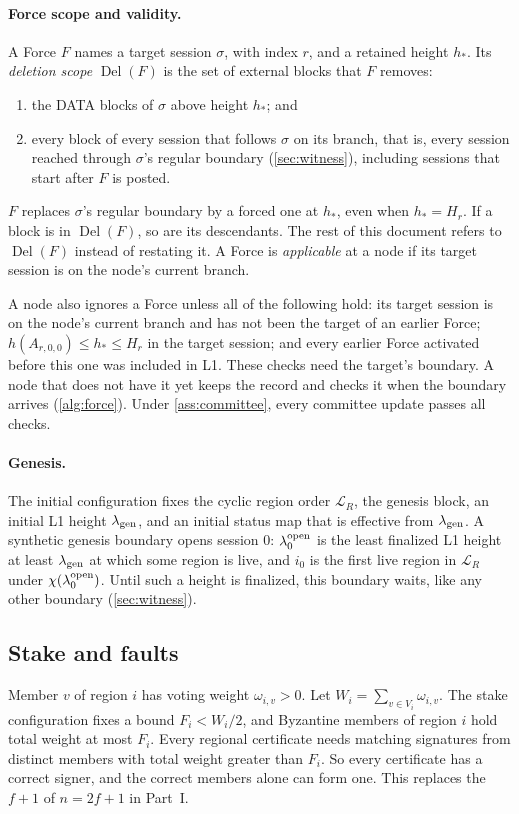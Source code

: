 \documentclass[11pt,a4paper]{article}
\newcommand{\Del}{\operatorname{Del}}
\newcommand{\defterm}[1]{\textcolor{rrBlue}{\textit{#1}}}
\begin{document}
\paragraph{Force scope and validity.}
A Force $F$ names a target session $\sigma$, with index $r$,
and a retained height $h_*$. Its \defterm{deletion scope} $\Del(F)$ is the
set of external blocks that $F$ removes:
\begin{enumerate}[label=(\roman*)]
\item the DATA blocks of $\sigma$ above height $h_*$; and
\item every block of every session that follows $\sigma$ on its
branch, that is, every session reached through $\sigma$'s regular
boundary (\cref{sec:witness}), including sessions that start after $F$
is posted.
\end{enumerate}
$F$ replaces $\sigma$'s regular boundary by a forced one at $h_*$,
even when $h_*=H_r$. If a block is in $\Del(F)$, so are its descendants.
The rest of this document refers to $\Del(F)$ instead of restating it.
A Force is \defterm{applicable} at a node if its target session is
on the node's current branch.

A node also ignores a Force unless all of the following
hold: its target session is on the node's current branch and has not
been the target of an earlier Force; $h(A_{r,0,0})\le h_*\le H_r$ in the
target session; and every earlier Force activated before this one was
included in L1. These checks need the target's boundary. A node that
does not have it yet keeps the record and checks it when the boundary
arrives (\cref{alg:force}). Under \cref{ass:committee}, every committee
update passes all checks.

\paragraph{Genesis.}
The initial configuration fixes the cyclic region order
$\mathcal L_R$, the genesis block, an initial L1 height
$\lambda_{\rm gen}$, and an initial status map that is effective from
$\lambda_{\rm gen}$. A synthetic genesis boundary opens session $0$:
$\lambda^{\rm open}_0$ is the least finalized L1 height at least
$\lambda_{\rm gen}$ at which some region is live, and $i_0$ is the first
live region in $\mathcal L_R$ under $\chi(\lambda^{\rm open}_0)$. Until
such a height is finalized, this boundary waits, like any other
boundary (\cref{sec:witness}).

\subsection{Stake and faults}
\label{sec:stake}
Member $v$ of region $i$ has voting weight $\omega_{i,v}>0$. Let
$W_i=\sum_{v\in V_i}\omega_{i,v}$. The stake configuration
fixes a bound $F_i<W_i/2$, and Byzantine members of region $i$ hold
total weight at most $F_i$. Every regional certificate needs
matching signatures from distinct members with total weight greater than
$F_i$. So every certificate has a correct signer, and the correct members
alone can form one. This replaces the $f+1$ of $n=2f+1$ in Part~I.
\end{document}
